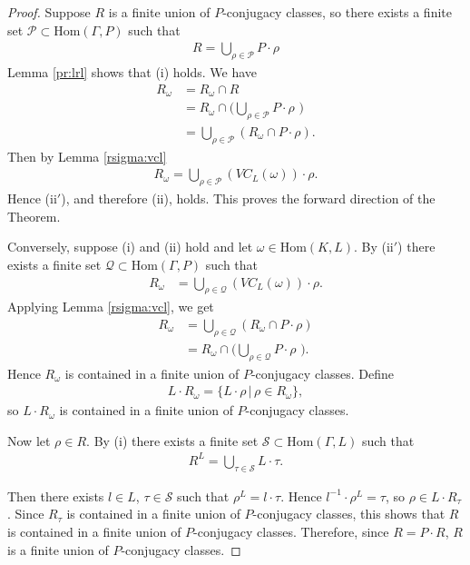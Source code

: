 \begin{proof}
Suppose $R$ is a finite union of $P$-conjugacy classes, so there exists a finite set $\mathcal{P} \subset \mathrm{Hom}(\Gamma, P)$ such that
\begin{align*} R = \bigcup_{\rho \in \mathcal{P}} P \cdot \rho \end{align*}
Lemma \ref{pr:lrl} shows that (i) holds. We have
\begin{align*} R_\omega &= R_\omega \cap R \\
&= R_\omega \cap \big( \bigcup_{\rho \in \mathcal{P}} P \cdot \rho \,\,\big) \\
&= \bigcup_{\rho \in \mathcal{P}} \left( R_\omega \cap P \cdot \rho \right).
\end{align*}
Then by Lemma \ref{rsigma:vcl}
\begin{align*} R_\omega = \bigcup_{\rho \in \mathcal{P}} (VC_L(\omega)) \cdot \rho. \end{align*}
Hence (ii$'$), and therefore (ii), holds. This proves the forward direction of the Theorem.


Conversely, suppose (i) and (ii) hold and let $\omega \in \mathrm{Hom}(K, L)$. By (ii$'$) there exists a finite set $\mathcal{Q} \subset \mathrm{Hom}(\Gamma, P)$ such that
\begin{align*}
	R_\omega &= \bigcup_{\rho \in \mathcal{Q}} (VC_L(\omega)) \cdot \rho.
\end{align*}
Applying Lemma \ref{rsigma:vcl}, we get
\begin{align*}
	R_\omega &= \bigcup_{\rho \in \mathcal{Q}} \left( R_\omega \cap P \cdot \rho \right) \\
	&= R_\omega \cap \big( \bigcup_{\rho \in \mathcal{Q}} P \cdot \rho \,\,\big).
\end{align*}
Hence $R_\omega$ is contained in a finite union of $P$-conjugacy classes.
Define
\begin{align*}
L \cdot R_\omega = \{L \cdot \rho \,|\, \rho \in R_\omega\},
\end{align*}
so $L \cdot R_\omega$ is contained in a finite union of $P$-conjugacy classes.

Now let $\rho \in R$. By (i) there exists a finite set $\mathcal{S} \subset \mathrm{Hom}(\Gamma, L)$ such that
\begin{align*}
R^L = \bigcup_{\tau \in \mathcal{S}} L \cdot \tau.
\end{align*}

Then there exists $l \in L$, $\tau \in \mathcal{S}$ such that $\rho^L = l \cdot \tau$. Hence $l^{-1} \cdot \rho^L = \tau$, so $\rho \in L \cdot R_\tau$. Since $R_\tau$ is contained in a finite union of $P$-conjugacy classes, this shows that $R$ is contained in a finite union of $P$-conjugacy classes. Therefore, since $R=P\cdot R$, $R$ is a finite union of $P$-conjugacy classes.
\end{proof}

